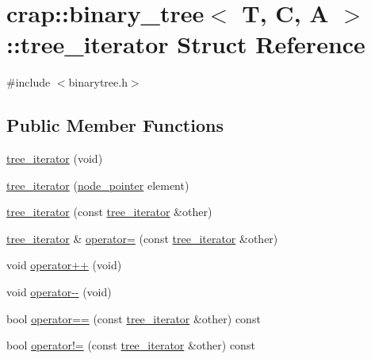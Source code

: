\hypertarget{structcrap_1_1binary__tree_1_1tree__iterator}{\section{crap\-:\-:binary\-\_\-tree$<$ T, C, A $>$\-:\-:tree\-\_\-iterator Struct Reference}
\label{structcrap_1_1binary__tree_1_1tree__iterator}
}


{\ttfamily \#include $<$binarytree.\-h$>$}

\subsection*{Public Member Functions}
\begin{DoxyCompactItemize}
\item 
\hyperlink{structcrap_1_1binary__tree_1_1tree__iterator_a3aa9d13fa33e42be6fb83fd91413dfd7}{tree\-\_\-iterator} (void)
\item 
\hyperlink{structcrap_1_1binary__tree_1_1tree__iterator_a495aba5dfcdae2ba041d45bd136314a7}{tree\-\_\-iterator} (\hyperlink{classcrap_1_1binary__tree_a04d7ea4aa1c1cc5bdd06cbdf3d537076}{node\-\_\-pointer} element)
\item 
\hyperlink{structcrap_1_1binary__tree_1_1tree__iterator_a2a4b32aa6da04ceb8374f57b69a49038}{tree\-\_\-iterator} (const \hyperlink{structcrap_1_1binary__tree_1_1tree__iterator}{tree\-\_\-iterator} \&other)
\item 
\hyperlink{structcrap_1_1binary__tree_1_1tree__iterator}{tree\-\_\-iterator} \& \hyperlink{structcrap_1_1binary__tree_1_1tree__iterator_af9f561a466424592a6edf5733498c9d6}{operator=} (const \hyperlink{structcrap_1_1binary__tree_1_1tree__iterator}{tree\-\_\-iterator} \&other)
\item 
void \hyperlink{structcrap_1_1binary__tree_1_1tree__iterator_afd8692cd1d3cfcfe9848457f8acea6bf}{operator++} (void)
\item 
void \hyperlink{structcrap_1_1binary__tree_1_1tree__iterator_ad27ad8d39ddc2f87545bec7ffa5fd506}{operator-\/-\/} (void)
\item 
bool \hyperlink{structcrap_1_1binary__tree_1_1tree__iterator_aa683328f2810df0e07255b6ad26903d3}{operator==} (const \hyperlink{structcrap_1_1binary__tree_1_1tree__iterator}{tree\-\_\-iterator} \&other) const 
\item 
bool \hyperlink{structcrap_1_1binary__tree_1_1tree__iterator_a70cff44fb6c88e8b0ae537809637ce8b}{operator!=} (const \hyperlink{structcrap_1_1binary__tree_1_1tree__iterator}{tree\-\_\-iterator} \&other) const 

\end{DoxyCompactItemize}
